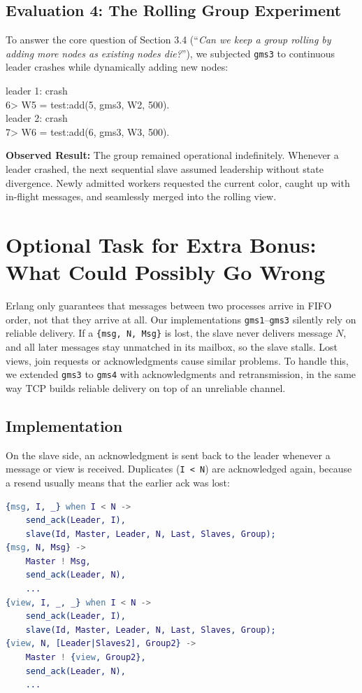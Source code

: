 \documentclass[a4paper, 11pt]{article}
\begin{document}
\subsection{Evaluation 4: The Rolling Group Experiment}
To answer the core question of Section 3.4 (``\emph{Can we keep a group rolling by adding more nodes as existing nodes die?}''), we subjected \texttt{gms3} to continuous leader crashes while dynamically adding new nodes:
\begin{tcolorbox}[terminalbox]
leader 1: crash \\
6> W5 = test:add(5, gms3, W2, 500). \\
leader 2: crash \\
7> W6 = test:add(6, gms3, W3, 500).
\end{tcolorbox}
\textbf{Observed Result:} The group remained operational indefinitely. Whenever a leader crashed, the next sequential slave assumed leadership without state divergence. Newly admitted workers requested the current color, caught up with in-flight messages, and seamlessly merged into the rolling view.

\section{Optional Task for Extra Bonus: What Could Possibly Go Wrong}

Erlang only guarantees that messages between two processes arrive in FIFO order, not that they arrive at all. Our implementations \texttt{gms1}--\texttt{gms3} silently rely on reliable delivery. If a \texttt{\{msg, N, Msg\}} is lost, the slave never delivers message $N$, and all later messages stay unmatched in its mailbox, so the slave stalls. Lost views, join requests or acknowledgments cause similar problems. To handle this, we extended \texttt{gms3} to \texttt{gms4} with acknowledgments and retransmission, in the same way TCP builds reliable delivery on top of an unreliable channel.

\subsection{Implementation}
On the slave side, an acknowledgment is sent back to the leader whenever a message or view is received. Duplicates (\texttt{I < N}) are acknowledged again, because a resend usually means that the earlier ack was lost:
\begin{lstlisting}[language=erlang]
{msg, I, _} when I < N ->
    send_ack(Leader, I),
    slave(Id, Master, Leader, N, Last, Slaves, Group);
{msg, N, Msg} ->
    Master ! Msg,
    send_ack(Leader, N),
    ...
{view, I, _, _} when I < N ->
    send_ack(Leader, I),
    slave(Id, Master, Leader, N, Last, Slaves, Group);
{view, N, [Leader|Slaves2], Group2} ->
    Master ! {view, Group2},
    send_ack(Leader, N),
    ...
\end{lstlisting}
\end{document}

